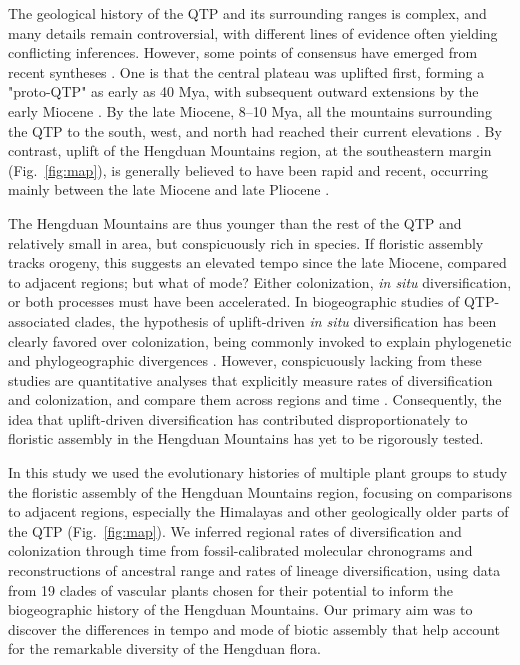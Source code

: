 \documentclass[9pt,twocolumn,twoside,lineno]{pnas-new}
\begin{document}
The geological history of the QTP and its surrounding ranges is
complex, and many details remain controversial, with different lines
of evidence often yielding conflicting inferences. However, some
points of consensus have emerged from recent syntheses
\citep{WangC2014,Favre2015,Deng2015,Renner2016}. One is that the
central plateau was uplifted first, forming a "proto-QTP" as early as
40 Mya, with subsequent outward extensions by the early Miocene
\citep{Rowley2006,WangC2014}. By the late Miocene, 8--10 Mya, all the
mountains surrounding the QTP to the south, west, and north had
reached their current elevations
\citep{Spicer2003,Fang2005,WangY2012,Deng2015}. By contrast, uplift of
the Hengduan Mountains region, at the southeastern margin
(Fig.~\ref{fig:map}), is generally believed to have been rapid and
recent, occurring mainly between the late Miocene and late Pliocene
\citep{kirby2002,clark2005,WangE2012,Wang2014,Meng2016,SunB2011}.

The Hengduan Mountains are thus younger than the rest of the QTP and
relatively small in area, but conspicuously rich in species. If
floristic assembly tracks orogeny, this suggests an elevated tempo
since the late Miocene, compared to adjacent regions; but what of
mode? Either colonization, \textit{in situ} diversification, or both
processes must have been accelerated. In biogeographic studies of
QTP-associated clades, the hypothesis of uplift-driven \textit{in
  situ} diversification has been clearly favored over colonization,
being commonly invoked to explain phylogenetic and phylogeographic
divergences
\citep[e.g.,][]{LiuJ2006,WangY2009,ZhangJ2014,GaoY2013}. However,
conspicuously lacking from these studies are quantitative analyses
that explicitly measure rates of diversification and colonization, and
compare them across regions and time
\citep{Wen2014,Favre2015}. Consequently, the idea that uplift-driven
diversification has contributed disproportionately to floristic
assembly in the Hengduan Mountains has yet to be rigorously tested.

In this study we used the evolutionary histories of multiple plant
groups to study the floristic assembly of the Hengduan Mountains
region, focusing on comparisons to adjacent regions, especially the
Himalayas and other geologically older parts of the QTP
(Fig.~\ref{fig:map}). We inferred regional rates of diversification
and colonization through time from fossil-calibrated molecular
chronograms and reconstructions of ancestral range and rates of
lineage diversification, using data from 19 clades of vascular plants
chosen for their potential to inform the biogeographic history of the
Hengduan Mountains. Our primary aim was to discover the differences in
tempo and mode of biotic assembly that help account for the remarkable
diversity of the Hengduan flora.
\end{document}
